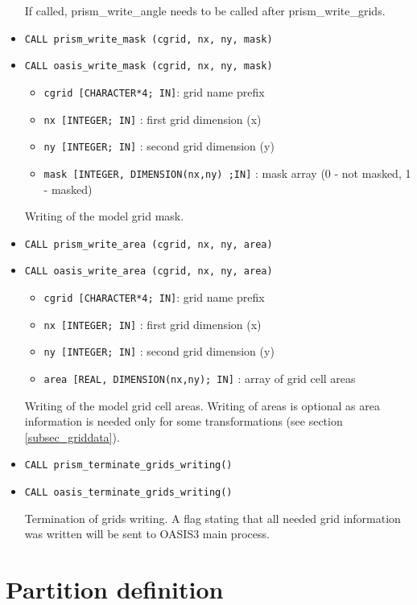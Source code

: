 \begin{itemize}
 If called,
 prism\_write\_angle needs to be called after prism\_write\_grids.

\item {\tt CALL prism\_write\_mask (cgrid, nx, ny, mask)}
\item {\tt CALL oasis\_write\_mask (cgrid, nx, ny, mask)}

 \begin{itemize}
    \item {\tt cgrid [CHARACTER*4; IN]}: grid name prefix 
    \item {\tt nx [INTEGER; IN]} : first grid dimension (x)
    \item {\tt ny [INTEGER; IN]} : second grid dimension (y)
    \item {\tt mask [INTEGER, DIMENSION(nx,ny) ;IN]} : mask array (0 - not masked, 1 - masked)
 \end{itemize}
Writing of the model grid mask.

\item {\tt CALL prism\_write\_area (cgrid, nx, ny, area)}
\item {\tt CALL oasis\_write\_area (cgrid, nx, ny, area)}

 \begin{itemize}
    \item {\tt cgrid [CHARACTER*4; IN]}: grid name prefix
    \item {\tt nx [INTEGER; IN]} : first grid dimension (x)
    \item {\tt ny [INTEGER; IN]} : second grid dimension (y)
    \item {\tt area [REAL, DIMENSION(nx,ny); IN]} : array of grid cell areas
 \end{itemize}
Writing of the model grid cell areas. Writing of areas is optional as
area information is needed only for some transformations (see section
\ref{subsec_griddata}).

\item {\tt CALL prism\_terminate\_grids\_writing()}
\item {\tt CALL oasis\_terminate\_grids\_writing()}

Termination of grids writing. A flag stating that all needed grid
information was written will be sent to OASIS3 main process.

\end{itemize}

\section{Partition definition}
\label{subsubsec_Partition}

